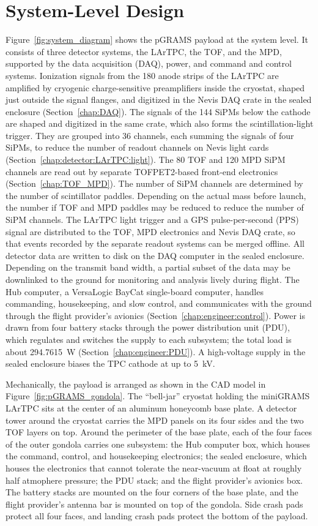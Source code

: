 \documentclass[a4paper,fleqn,longmktitle]{cas-dc}
\begin{document}
\section{System-Level Design}\label{chap:system}
Figure~\ref{fig:system_diagram} shows the pGRAMS payload at the system level.
It consists of three detector systems, the LArTPC, the TOF, and the MPD, supported by the data acquisition (DAQ), power, and command and control systems.
Ionization signals from the 180 anode strips of the LArTPC are amplified by cryogenic charge-sensitive preamplifiers inside the cryostat, shaped just outside the signal flanges, and digitized in the Nevis DAQ crate in the sealed enclosure (Section~\ref{chap:DAQ}).
The signals of the 144 SiPMs below the cathode are shaped and digitized in the same crate, which also forms the scintillation-light trigger. They are grouped into 36 channels, each summing the signals of four SiPMs, to reduce the number of readout channels on Nevis light cards (Section~\ref{chap:detector:LArTPC:light}).
The 80 TOF and 120 MPD SiPM channels are read out by separate TOFPET2-based front-end electronics (Section~\ref{chap:TOF_MPD}). The number of SiPM channels are determined by the number of scintillator paddles. Depending on the actual mass before launch, the number if TOF and MPD paddles may be reduced to reduce the number of SiPM channels. 
The LArTPC light trigger and a GPS pulse-per-second (PPS) signal are distributed to the TOF, MPD electronics and Nevis DAQ crate, so that events recorded by the separate readout systems can be merged offline.
All detector data are written to disk on the DAQ computer in the sealed enclosure. Depending on the transmit band width, a partial subset of the data may be downlinked to the ground for monitoring and analysis lively during flight.
The Hub computer, a VersaLogic BayCat single-board computer, handles commanding, housekeeping, and slow control, and communicates with the ground through the flight provider's avionics (Section~\ref{chap:engineer:control}).
Power is drawn from four battery stacks through the power distribution unit (PDU), which regulates and switches the supply to each subsystem; the total load is about 294.7615~W (Section~\ref{chap:engineer:PDU}).
A high-voltage supply in the sealed enclosure biases the TPC cathode at up to 5~kV.
 
Mechanically, the payload is arranged as shown in the CAD model in Figure~\ref{fig:pGRAMS_gondola}.
The ``bell-jar'' cryostat holding the miniGRAMS LArTPC sits at the center of an aluminum honeycomb base plate.
A detector tower around the cryostat carries the MPD panels on its four sides and the two TOF layers on top.
Around the perimeter of the base plate, each of the four faces of the outer gondola carries one subsystem: the Hub computer box, which houses the command, control, and housekeeping electronics; the sealed enclosure, which houses the electronics that cannot tolerate the near-vacuum at float at roughly half atmophere pressure; the PDU stack; and the flight provider's avionics box.
The battery stacks are mounted on the four corners of the base plate, and the flight provider's antenna bar is mounted on top of the gondola.
Side crash pads protect all four faces, and landing crash pads protect the bottom of the payload.
 
\end{document}
